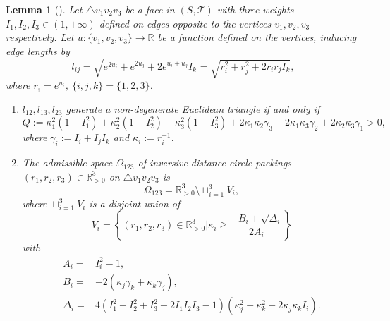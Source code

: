 \documentclass[12pt]{amsart}
\newtheorem{lemma}[theorem]{Lemma}
\begin{document}
	\begin{lemma}[\cite{Xu MRL}]\label{basic property I of IDCP}
	Let $\triangle v_1v_2v_3$ be a face in $(S, \mathcal{T})$ with three weights $I_1,I_2,I_3\in (1, +\infty)$ defined on edges opposite to the vertices $v_1, v_2, v_3$ respectively.
Let $u: \{v_1, v_2, v_3\}\rightarrow \mathbb{R}$ be a function defined on the vertices, inducing edge lengths by
		\begin{equation}
		\label{length2}
			l_{ij}= \sqrt{e^{2u_i}+e^{2u_j}+2e^{u_i+u_j}I_{k}} =  \sqrt{r_i^2+r_j^2+2r_ir_jI_{k}},
		\end{equation}
where $r_i=e^{u_i}$, $\{i,j,k\}=\{1,2,3\}$.
\begin{enumerate}
  \item[(a)] $l_{12}, l_{13}, l_{23}$ generate a non-degenerate Euclidean triangle if and only if
  \begin{equation}
  \label{definitionQ}
       Q:=\kappa_1^2(1-I^2_{1})+\kappa_2^2(1-I^2_{2})+\kappa_3^2(1-I^2_{3})
		+2\kappa_1\kappa_2\gamma_{3}+2\kappa_1\kappa_3\gamma_{2}+2\kappa_2\kappa_3\gamma_{1}>0,
  \end{equation}
where $\gamma_{i}:=I_{i}+I_{j}I_{k}$ and $\kappa_i:=r_i^{-1}$.
    \item[(b)]  The admissible space $\Omega_{123}$ of inversive distance circle packings $(r_1, r_2, r_3)\in \mathbb{R}^3_{>0}$
on $\triangle v_1v_2v_3$ is
$$\Omega_{123}=\mathbb{R}^3_{>0}\setminus \sqcup_{i=1}^3V_i,$$
where	$\sqcup_{i=1}^3V_i$ is a disjoint union of
		$$V_i=\left\{(r_1, r_2, r_3)\in \mathbb{R}^3_{>0}|\kappa_i\geq \frac{-B_i+\sqrt{\Delta_i}}{2A_i}\right\}$$
		with
		\begin{equation}
		\label{discriminant}
			\begin{aligned}
				A_i=&I^2_{i}-1,\\
				B_i=&-2(\kappa_j\gamma_{k}+\kappa_{k}\gamma_j),\\
				\Delta_i
				=&4(I_1^2+I_2^2+I_{3}^2+2I_1I_2I_{3}-1)(\kappa_j^2+\kappa_{k}^2+2\kappa_j\kappa_{k}I_i).
			\end{aligned}
		\end{equation}

\end{enumerate}
	\end{lemma}
\end{document}
